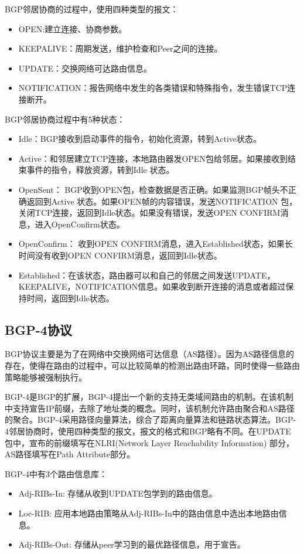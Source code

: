 BGP邻居协商的过程中，使用四种类型的报文：

\begin{itemize}
\item OPEN:建立连接、协商参数。
\item KEEPALIVE：周期发送，维护检查和Peer之间的连接。
\item UPDATE：交换网络可达路由信息。
\item NOTIFICATION：报告网络中发生的各类错误和特殊指令，发生错误TCP连接断开。
\end{itemize}

BGP邻居协商过程中有5种状态：

\begin{itemize}
\item Idle：BGP接收到启动事件的指令，初始化资源，转到Active状态。
\item Active：和邻居建立TCP连接，本地路由器发OPEN包给邻居。如果接收到结束事件的指令，释放资源，转到Idle 状态。
\item OpenSent： BGP收到OPEN包，检查数据是否正确。如果监测BGP帧头不正确返回到Active 状态。如果OPEN帧的内容错误，发送NOTIFICATION 包，关闭TCP连接，返回到Idle状态。如果没有错误，发送OPEN CONFIRM消息，进入OpenConfirm状态。
\item OpenConfirm： 收到OPEN CONFIRM消息，进入Established状态，如果长时间没有收到OPEN CONFIRM消息，返回到Idle状态。
\item Established：在该状态，路由器可以和自己的邻居之间发送UPDATE，KEEPALIVE，NOTIFICATION信息。如果收到断开连接的消息或者超过保持时间，返回到Idle状态。
\end{itemize}



\subsection{BGP-4协议}
BGP协议主要是为了在网络中交换网络可达信息（AS路径）。因为AS路径信息的存在，使得在路由的过程中，可以比较简单的检测出路由环路，同时使得一些路由策略能够被强制执行。

BGP-4是BGP的扩展，BGP-4提出一个新的支持无类域间路由的机制。在该机制中支持宣告IP前缀，去除了地址类的概念。同时，该机制允许路由聚合和AS路径的聚合。BGP-4采用路径向量算法，综合了距离向量算法和链路状态算法。BGP-4邻居协商时，使用四种类型的报文，报文的格式和BGP略有不同。在UPDATE 包中，宣布的前缀填写在NLRI(Network Layer Reachability Information) 部分，AS路径填写在Path Attribute部分。

BGP-4中有3个路由信息库：
\begin{itemize}
\item Adj-RIBs-In: 存储从收到UPDATE包学到的路由信息。
\item Loc-RIB: 应用本地路由策略从Adj-RIBs-In中的路由信息中选出本地路由信息。
\item Adj-RIBs-Out: 存储从peer学习到的最优路径信息，用于宣告。
\end{itemize}


